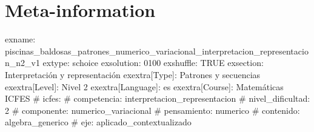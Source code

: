 \documentclass[
]{article}
\begin{document}
\section{Meta-information}\label{meta-information}

exname:
piscinas\_baldosas\_patrones\_numerico\_variacional\_interpretacion\_representacion\_n2\_v1
extype: schoice exsolution: 0100 exshuffle: TRUE exsection:
Interpretación y representación exextra{[}Type{]}: Patrones y secuencias
exextra{[}Level{]}: Nivel 2 exextra{[}Language{]}: es
exextra{[}Course{]}: Matemáticas ICFES \# icfes: \# competencia:
interpretacion\_representacion \# nivel\_dificultad: 2 \# componente:
numerico\_variacional \# pensamiento: numerico \# contenido:
algebra\_generico \# eje: aplicado\_contextualizado
\end{document}
